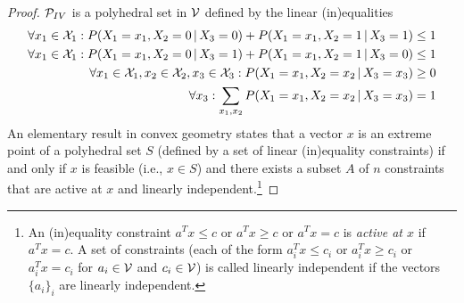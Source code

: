 \begin{proof}
  $\mathcal{P}_{IV}$ is a polyhedral set in $\mathcal{V}$ defined by the linear (in)equalities
  \begin{align*}
    \forall x_1\in\mathcal{X}_1: P(X_1=x_1,X_2=0 \operatorname*{|} X_3=0) + P(X_1=x_1,X_2=1 \operatorname*{|} X_3=1) &\le 1 \\
    \forall x_1\in\mathcal{X}_1: P(X_1=x_1,X_2=0 \operatorname*{|} X_3=1) + P(X_1=x_1,X_2=1 \operatorname*{|} X_3=0) &\le 1 \\
    \forall x_1\in\mathcal{X}_1,x_2\in\mathcal{X}_2,x_3\in\mathcal{X}_3: P(X_1=x_1,X_2=x_2 \operatorname*{|} X_3=x_3) &\ge 0 \\
    \forall x_3: \sum_{x_1,x_2} P(X_1=x_1,X_2=x_2 \operatorname*{|} X_3=x_3) &= 1
  \end{align*}
  An elementary result in convex geometry states that a vector $x$ is an extreme point of a polyhedral set $S$ (defined by a set of linear (in)equality constraints) if and only if $x$ is feasible (i.e., $x \in S$) and there exists a subset $A$ of 
  $n$ constraints that are active at $x$ and linearly independent.\footnote{An (in)equality constraint $a^T x \le c$ or $a^T x \ge c$ or $a^T x = c$ is \emph{active at $x$} if $a^T x = c$. A set of constraints (each of the form $a_i^T x \le c_i$ or $a_i^T x \ge c_i$ or $a_i^T x = c_i$ for $a_i \in \mathcal{V}$ and $c_i \in \mathcal{V}$) is called linearly independent if the vectors $\{a_i\}_i$ are linearly independent.}


\end{proof}
